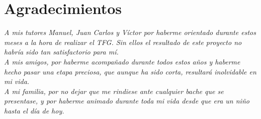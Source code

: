 \pagestyle{plain}
\chapter*{Agradecimientos}

{\it 
A mis tutores Manuel, Juan Carlos y Víctor por haberme orientado durante estos meses a la hora de realizar el TFG. Sin ellos el resultado de este proyecto no habría sido tan satisfactorio para mí.
\\

A mis amigos, por haberme acompañado durante todos estos años y haberme hecho pasar una etapa preciosa, que aunque ha sido corta, resultará inolvidable en mi vida.
\\

A mi familia, por no dejar que me rindiese ante cualquier bache que se presentase, y por haberme animado durante toda mi vida desde que era un niño hasta el día de hoy.
}